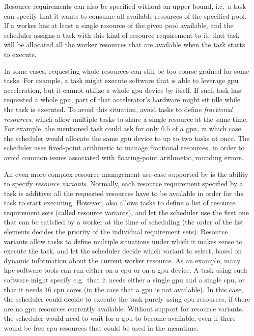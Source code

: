 Resource requirements can also be specified without an upper bound, i.e.\ a task can specify that
it wants to consume all available resources of the specified pool. If a worker has at least a
single resource of the given pool available, and the scheduler assigns a task with this kind of
resource requirement to it, that task will be allocated all the worker resources that are available
when the task starts to execute.

In some cases, requesting whole resources can still be too coarse-grained for some tasks. For
example, a task might execute software that is able to leverage \gls{gpu}
acceleration, but it cannot utilize a whole \gls{gpu} device by itself. If such task
has requested a whole \gls{gpu}, part of that accelerator's hardware might sit idle
while the task is executed. To avoid this situation, \hyperqueue{} avoid tasks to define
\emph{fractional resources}, which allow multiple tasks to share a single resource at the same time.
For example, the mentioned task could ask for only $0.5$ of a
\gls{gpu}, in which case the scheduler would allocate the same
\gls{gpu} device to up to two tasks at once. The scheduler uses fixed-point
arithmetic to manage fractional resources, in order to avoid common issues associated with
floating-point arithmetic, rounding errors.

An even more complex resource management use-case supported by \hyperqueue{} is the
ability to specify \emph{resource variants}. Normally, each resource requirement specified by a task
is additive; all the requested resources have to be available in order for the task to start
executing. However, \hq{} also allows tasks to define a list of resource
requirement sets (called resource variants), and let the scheduler use the first one that can be
satisfied by a worker at the time of scheduling (the order of the list elements decides the
priority of the individual requirement sets). Resource variants allow tasks to define multiple
situations under which it makes sense to execute the task, and let the scheduler decide which
variant to select, based on dynamic information about the current worker resource. As an example,
many \gls{hpc} software tools can run either on a \gls{cpu} or on a
\gls{gpu} device. A task using such software might specify e.g.\ that it needs either
a single \gls{gpu} and a single \gls{cpu}, or that it needs
$16$ \gls{cpu} cores (in the case that a \gls{gpu} is
not available). In this case, the scheduler could decide to execute the task purely using
\gls{cpu} resources, if there are no \gls{gpu} resources currently
available. Without support for resource variants, the scheduler would need to wait for a
\gls{gpu} to become available, even if there would be free \gls{cpu}
resources that could be used in the meantime.

